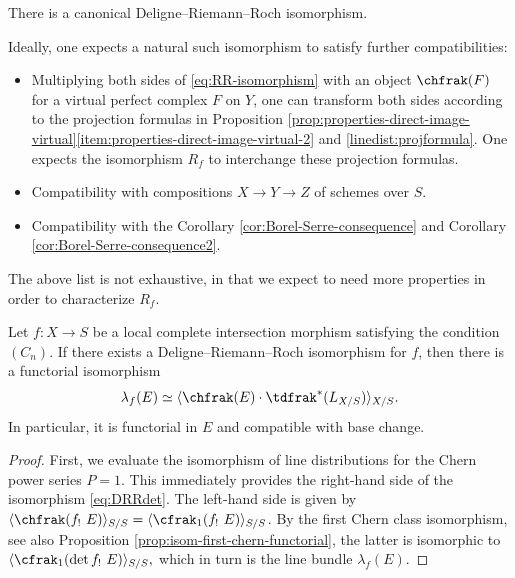 \begin{conjecture}
There is a canonical Deligne--Riemann--Roch isomorphism.

\end{conjecture}
Ideally, one expects a natural such isomorphism to satisfy further compatibilities:

\begin{itemize}
\item Multiplying both sides of \eqref{eq:RR-isomorphism} with an object $\chfrak(F)$ for a virtual perfect complex $F$ on $Y$, one can transform both sides according to the projection formulas in Proposition \ref{prop:properties-direct-image-virtual}\eqref{item:properties-direct-image-virtual-2} and \eqref{linedist:projformula}. One expects the isomorphism $R_{f}$ to interchange these projection formulas.
\item Compatibility with compositions $X \to Y \to Z$ of schemes over $S$.
\item Compatibility with the Corollary \ref{cor:Borel-Serre-consequence} and Corollary \ref{cor:Borel-Serre-consequence2}.
\end{itemize}
The above list is not exhaustive, in that we expect to need more properties in order to characterize $R_{f}$.

\begin{corollary}
Let $f: X \to S$ be a local complete intersection morphism satisfying the condition $(C_n)$. If there exists a Deligne--Riemann--Roch isomorphism for $f$, then there is a functorial isomorphism
\begin{equation}\label{eq:DRRdet}
\lambda_{f}(E) \simeq \langle \chfrak(E) \cdot \tdfrak^{\ast}(L_{X/S}) \rangle_{X/S}.
\end{equation}
In particular, it is functorial in $E$ and compatible with base change.
\end{corollary}

\begin{proof}
First, we evaluate the isomorphism of line distributions for the Chern power series $P = 1$. This immediately provides the right-hand side of the isomorphism \eqref{eq:DRRdet}. The left-hand side is given by $\langle \chfrak(f_!\ E) \rangle_{S/S} = \langle \cfrak_1(f_!\ E) \rangle_{S/S} $. By the first Chern class isomorphism, see also Proposition \ref{prop:isom-first-chern-functorial}, the latter is isomorphic to $ \langle \cfrak_1(\det f_!\ E) \rangle_{S/S}, $ which in turn is the line bundle $\lambda_{f}(E)$.
\end{proof}
